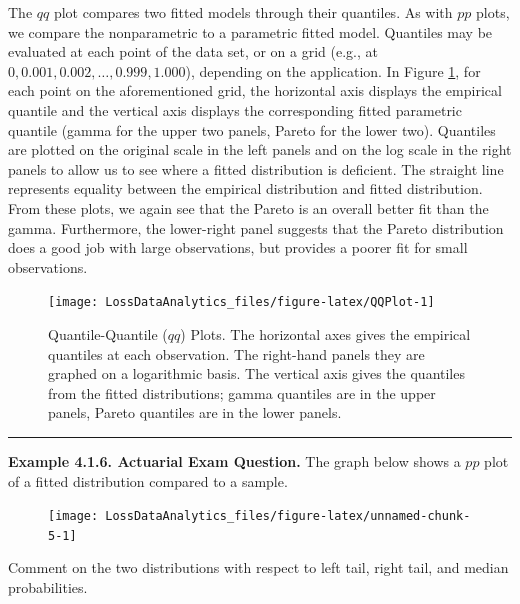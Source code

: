 \documentclass[]{book}
\theoremstyle{definition}
\theoremstyle{definition}
\theoremstyle{definition}
\theoremstyle{remark}
\begin{document}
The \(qq\) plot compares two fitted models through their quantiles. As
with \(pp\) plots, we compare the nonparametric to a parametric fitted
model. Quantiles may be evaluated at each point of the data set, or on a
grid (e.g., at \(0, 0.001, 0.002, \ldots, 0.999, 1.000\)), depending on
the application. In Figure \ref{fig:QQPlot}, for each point on the
aforementioned grid, the horizontal axis displays the empirical quantile
and the vertical axis displays the corresponding fitted parametric
quantile (gamma for the upper two panels, Pareto for the lower two).
Quantiles are plotted on the original scale in the left panels and on
the log scale in the right panels to allow us to see where a fitted
distribution is deficient. The straight line represents equality between
the empirical distribution and fitted distribution. From these plots, we
again see that the Pareto is an overall better fit than the gamma.
Furthermore, the lower-right panel suggests that the Pareto distribution
does a good job with large observations, but provides a poorer fit for
small observations.

\begin{figure}

{\centering \texttt{[image: LossDataAnalytics\_files/figure-latex/QQPlot-1]} 

}

\caption{Quantile-Quantile ($qq$) Plots. The horizontal axes gives the empirical quantiles at each observation. The right-hand panels they are graphed on a logarithmic basis. The vertical axis gives the quantiles from the fitted distributions; gamma quantiles are in the upper panels, Pareto quantiles are in the lower panels.}\label{fig:QQPlot}
\end{figure}

\begin{center}\rule{0.5\linewidth}{\linethickness}\end{center}

\textbf{Example 4.1.6. Actuarial Exam Question.} The graph below shows a
\(pp\) plot of a fitted distribution compared to a sample.

\begin{figure}

{\centering \texttt{[image: LossDataAnalytics\_files/figure-latex/unnamed-chunk-5-1]} 

}

\end{figure}

Comment on the two distributions with respect to left tail, right tail,
and median probabilities.
\end{document}
